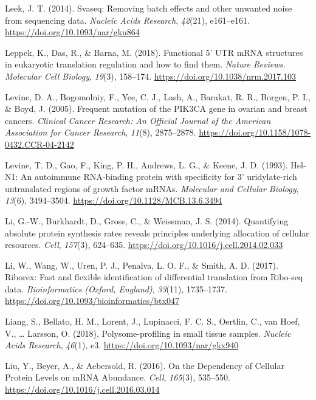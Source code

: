 \documentclass[12pt,openany]{book}
\begin{document}
\hypertarget{ref-Leek2014}{}
Leek, J. T. (2014). Svaseq: Removing batch effects and other unwanted
noise from sequencing data. \emph{Nucleic Acids Research},
\emph{42}(21), e161--e161. \url{https://doi.org/10.1093/nar/gku864}

\hypertarget{ref-Leppek2018}{}
Leppek, K., Das, R., \& Barna, M. (2018). Functional 5' UTR mRNA
structures in eukaryotic translation regulation and how to find them.
\emph{Nature Reviews. Molecular Cell Biology}, \emph{19}(3), 158--174.
\url{https://doi.org/10.1038/nrm.2017.103}

\hypertarget{ref-Levine2005}{}
Levine, D. A., Bogomolniy, F., Yee, C. J., Lash, A., Barakat, R. R.,
Borgen, P. I., \& Boyd, J. (2005). Frequent mutation of the PIK3CA gene
in ovarian and breast cancers. \emph{Clinical Cancer Research: An
Official Journal of the American Association for Cancer Research},
\emph{11}(8), 2875--2878.
\url{https://doi.org/10.1158/1078-0432.CCR-04-2142}

\hypertarget{ref-Levine1993}{}
Levine, T. D., Gao, F., King, P. H., Andrews, L. G., \& Keene, J. D.
(1993). Hel-N1: An autoimmune RNA-binding protein with specificity for
3' uridylate-rich untranslated regions of growth factor mRNAs.
\emph{Molecular and Cellular Biology}, \emph{13}(6), 3494--3504.
\url{https://doi.org/10.1128/MCB.13.6.3494}

\hypertarget{ref-Li2014}{}
Li, G.-W., Burkhardt, D., Gross, C., \& Weissman, J. S. (2014).
Quantifying absolute protein synthesis rates reveals principles
underlying allocation of cellular resources. \emph{Cell}, \emph{157}(3),
624--635. \url{https://doi.org/10.1016/j.cell.2014.02.033}

\hypertarget{ref-Li2017}{}
Li, W., Wang, W., Uren, P. J., Penalva, L. O. F., \& Smith, A. D.
(2017). Riborex: Fast and flexible identification of differential
translation from Ribo-seq data. \emph{Bioinformatics (Oxford, England)},
\emph{33}(11), 1735--1737.
\url{https://doi.org/10.1093/bioinformatics/btx047}

\hypertarget{ref-Liang2018}{}
Liang, S., Bellato, H. M., Lorent, J., Lupinacci, F. C. S., Oertlin, C.,
van Hoef, V., \ldots{} Larsson, O. (2018). Polysome-profiling in small
tissue samples. \emph{Nucleic Acids Research}, \emph{46}(1), e3.
\url{https://doi.org/10.1093/nar/gkx940}

\hypertarget{ref-Liu2016}{}
Liu, Y., Beyer, A., \& Aebersold, R. (2016). On the Dependency of
Cellular Protein Levels on mRNA Abundance. \emph{Cell}, \emph{165}(3),
535--550. \url{https://doi.org/10.1016/j.cell.2016.03.014}
\end{document}
